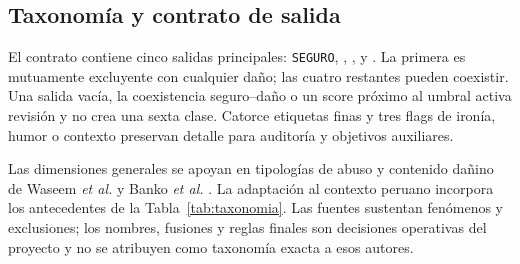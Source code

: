 \subsection{Taxonomía y contrato de salida}

El contrato contiene cinco salidas principales: \texttt{SEGURO}, \Rac, \Gen, \Ame{} y \Sex. La primera es mutuamente excluyente con cualquier daño; las cuatro restantes pueden coexistir. Una salida vacía, la coexistencia seguro--daño o un score próximo al umbral activa revisión y no crea una sexta clase. Catorce etiquetas finas y tres flags de ironía, humor o contexto preservan detalle para auditoría y objetivos auxiliares.

Las dimensiones generales se apoyan en tipologías de abuso y contenido dañino de Waseem \emph{et al.} y Banko \emph{et al.} \cite{waseem2017abuse,banko2020taxonomy}. La adaptación al contexto peruano incorpora los antecedentes de la Tabla~\ref{tab:taxonomia}. Las fuentes sustentan fenómenos y exclusiones; los nombres, fusiones y reglas finales son decisiones operativas del proyecto y no se atribuyen como taxonomía exacta a esos autores.

